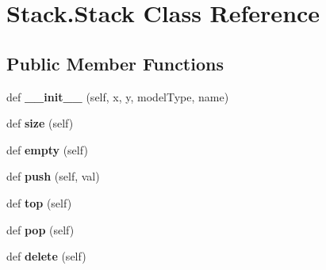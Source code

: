 \hypertarget{class_stack_1_1_stack}{}\section{Stack.\+Stack Class Reference}
\label{class_stack_1_1_stack}
\subsection*{Public Member Functions}
\begin{DoxyCompactItemize}
\item 
def {\bfseries \+\_\+\+\_\+init\+\_\+\+\_\+} (self, x, y, model\+Type, name)\hypertarget{class_stack_1_1_stack_a7f70c39c7407c4939620daec869a821f}{}\label{class_stack_1_1_stack_a7f70c39c7407c4939620daec869a821f}

\item 
def {\bfseries size} (self)\hypertarget{class_stack_1_1_stack_ad9471af89d6d83d7bc042b75bd6c1995}{}\label{class_stack_1_1_stack_ad9471af89d6d83d7bc042b75bd6c1995}

\item 
def {\bfseries empty} (self)\hypertarget{class_stack_1_1_stack_a9067f94dbf1a0d820abd4eb0339d6326}{}\label{class_stack_1_1_stack_a9067f94dbf1a0d820abd4eb0339d6326}

\item 
def {\bfseries push} (self, val)\hypertarget{class_stack_1_1_stack_a88abef205b55d9d26ef7958d61c4c313}{}\label{class_stack_1_1_stack_a88abef205b55d9d26ef7958d61c4c313}

\item 
def {\bfseries top} (self)\hypertarget{class_stack_1_1_stack_a5f953865bd581272431c9a1664aa43ec}{}\label{class_stack_1_1_stack_a5f953865bd581272431c9a1664aa43ec}

\item 
def {\bfseries pop} (self)\hypertarget{class_stack_1_1_stack_a3bc727e674359c79cfd00996895ffe4e}{}\label{class_stack_1_1_stack_a3bc727e674359c79cfd00996895ffe4e}

\item 
def {\bfseries delete} (self)\hypertarget{class_stack_1_1_stack_a763aefe5c343111354717047aebd7967}{}\label{class_stack_1_1_stack_a763aefe5c343111354717047aebd7967}

\end{DoxyCompactItemize}
